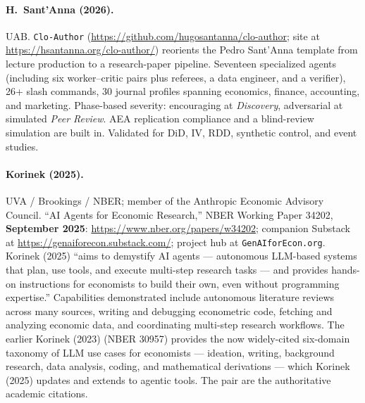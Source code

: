 \documentclass[11pt]{article}
\begin{document}
\paragraph{H.\ Sant'Anna (2026).} UAB. \texttt{Clo-Author} (\url{https://github.com/hugosantanna/clo-author}; site at \url{https://hsantanna.org/clo-author/}) reorients the Pedro Sant'Anna template from lecture production to a research-paper pipeline. Seventeen specialized agents (including six worker--critic pairs plus referees, a data engineer, and a verifier), 26+ slash commands, 30 journal profiles spanning economics, finance, accounting, and marketing. Phase-based severity: encouraging at \emph{Discovery}, adversarial at simulated \emph{Peer Review}. AEA replication compliance and a blind-review simulation are built in. Validated for DiD, IV, RDD, synthetic control, and event studies.

\paragraph{Korinek (2025).} UVA / Brookings / NBER; member of the Anthropic Economic Advisory Council. ``AI Agents for Economic Research,'' NBER Working Paper 34202, \textbf{September 2025}: \url{https://www.nber.org/papers/w34202}; companion Substack at \url{https://genaiforecon.substack.com/}; project hub at \texttt{GenAIforEcon.org}. Korinek (2025) ``aims to demystify AI agents --- autonomous LLM-based systems that plan, use tools, and execute multi-step research tasks --- and provides hands-on instructions for economists to build their own, even without programming expertise.'' Capabilities demonstrated include autonomous literature reviews across many sources, writing and debugging econometric code, fetching and analyzing economic data, and coordinating multi-step research workflows. The earlier Korinek (2023) (NBER 30957) provides the now widely-cited six-domain taxonomy of LLM use cases for economists --- ideation, writing, background research, data analysis, coding, and mathematical derivations --- which Korinek (2025) updates and extends to agentic tools. The pair are the authoritative academic citations.
\end{document}
